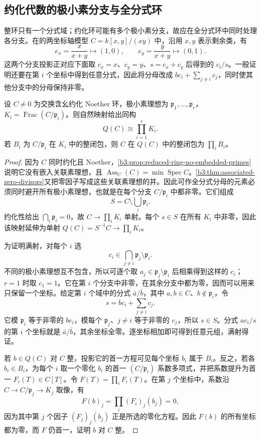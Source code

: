 \subsection{约化代数的极小素分支与全分式环}
\label{b3:subsec:0605:04}

整环只有一个分式域；约化环可能有多个极小素分支，故应在全分式环中同时处理各分支。在的两坐标轴模型 \(C=k[x,y]/(xy)\) 中，沿用 \(x,y\) 表示剩余类，有
\[
	e_x=\frac{x}{x+y}\longmapsto(1,0),\qquad e_y=\frac{y}{x+y}\longmapsto(0,1).
\]
这两个分支投影正对应下面取 \(c_x=x\)、\(c_y=y\)、\(s=c_x+c_y\) 后得到的 \(c_i/s\)。一般证明还要在第 \(i\) 个坐标中得到任意分式，因此将分母改成 \(bc_i+\sum_{j\ne i}c_j\)，同时使其他分支中的分母保持非零。

\begin{proposition}\label{b3:prop:reduced-total-quotient-product}
	设 \(C\ne0\) 为交换含幺约化 Noether 环，极小素理想为 \(\mathfrak p_1,\ldots,\mathfrak p_r\)，\(K_i=\operatorname{Frac}(C/\mathfrak p_i)\)。则自然映射给出同构
	\begin{equation}\label{b3:eq:reduced-total-quotient-product}
		Q(C)\cong\prod_{i=1}^rK_i.
	\end{equation}
	若 \(B_i\) 为 \(C/\mathfrak p_i\) 在 \(K_i\) 中的整闭包，则 \(C\) 在 \(Q(C)\) 中的整闭包为 \(\prod_iB_i\)。
\end{proposition}
\begin{proof}
	因为 \(C\) 同时约化且 Noether，\cref{b3:prop:reduced-ring-no-embedded-primes}说明它没有嵌入关联素理想，且 \(\operatorname{Ass}_C(C)=\min\operatorname{Spec}C\)。\cref{b3:thm:associated-zero-divisors}又把零因子写成这些关联素理想的并。因此可作全分式分母的元素必须同时避开所有极小素理想，也就是在每个分支 \(C/\mathfrak p_i\) 中都非零。它们组成
	\[
		S=C\setminus\bigcup_i\mathfrak p_i.
	\]
	约化性给出 \(\bigcap_i\mathfrak p_i=0\)，故 \(C\rightarrow\prod_iK_i\) 单射。每个 \(s\in S\) 在所有 \(K_i\) 中非零，因此该映射延伸为单射 \(Q(C)=S^{-1}C\rightarrow\prod_iK_i\)。

	为证明满射，对每个 \(i\) 选
	\[
		c_i\in\bigcap_{j\ne i}\mathfrak p_j\setminus\mathfrak p_i.
	\]
	不同的极小素理想互不包含，所以可逐个取 \(a_j\in\mathfrak p_j\setminus\mathfrak p_i\) 后相乘得到这样的 \(c_i\)；\(r=1\) 时取 \(c_1=1\)。它在第 \(i\) 个分支中非零，在其余分支中都为零，因而可以用来只保留一个坐标。给定第 \(i\) 个域中的分式 \(\bar a/\bar b\)，其中 \(a,b\in C\)、\(b\notin\mathfrak p_i\)，令
	\[
		s=bc_i+\sum_{j\ne i}c_j.
	\]
	它模 \(\mathfrak p_i\) 等于非零的 \(bc_i\)，模每个 \(\mathfrak p_j\)、\(j\ne i\) 等于非零的 \(c_j\)，所以 \(s\in S\)。分式 \(ac_i/s\) 的第 \(i\) 个坐标就是 \(\bar a/\bar b\)，其余坐标全零。逐坐标相加即可得到任意元组，满射得证。

	若 \(b\in Q(C)\) 对 \(C\) 整，投影它的首一方程可见每个坐标 \(b_i\) 属于 \(B_i\)。反之，若各 \(b_i\in B_i\)，为每个 \(i\) 取一个零化 \(b_i\) 的首一 \((C/\mathfrak p_i)\) 系数多项式，并把系数提升为首一 \(F_i(T)\in C[T]\)。令 \(F(T)=\prod_iF_i(T)\)。在第 \(j\) 个坐标中，系数沿 \(C\to C/\mathfrak p_j\to K_j\) 取像，有
	\[
		F(b)_j=\prod_i(F_i)_j(b_j)=0,
	\]
	因为其中第 \(j\) 个因子 \((F_j)_j(b_j)\) 正是所选的零化方程。因此 \(F(b)\) 的所有坐标都为零，而 \(F\) 仍首一，证明 \(b\) 对 \(C\) 整。
\end{proof}


